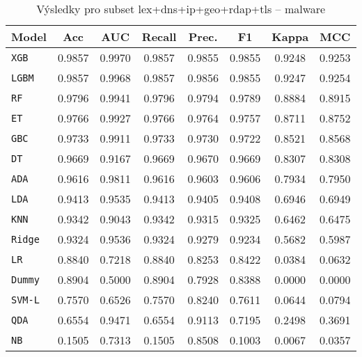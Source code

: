 \begin{table}[H]
  \centering
  \small
  \caption{Výsledky pro subset lex+dns+ip+geo+rdap+tls – malware}
  \begin{tabular}{|l|c|c|c|c|c|c|c|}
    \hline
    \textbf{Model} & \textbf{Acc} & \textbf{AUC} & \textbf{Recall} & \textbf{Prec.} & \textbf{F1} & \textbf{Kappa} & \textbf{MCC} \\
    \hline
    \texttt{XGB} & 0.9857 & 0.9970 & 0.9857 & 0.9855 & 0.9855 & 0.9248 & 0.9253 \\
    \texttt{LGBM} & 0.9857 & 0.9968 & 0.9857 & 0.9856 & 0.9855 & 0.9247 & 0.9254 \\
    \texttt{RF} & 0.9796 & 0.9941 & 0.9796 & 0.9794 & 0.9789 & 0.8884 & 0.8915 \\
    \texttt{ET} & 0.9766 & 0.9927 & 0.9766 & 0.9764 & 0.9757 & 0.8711 & 0.8752 \\
    \texttt{GBC} & 0.9733 & 0.9911 & 0.9733 & 0.9730 & 0.9722 & 0.8521 & 0.8568 \\
    \texttt{DT} & 0.9669 & 0.9167 & 0.9669 & 0.9670 & 0.9669 & 0.8307 & 0.8308 \\
    \texttt{ADA} & 0.9616 & 0.9811 & 0.9616 & 0.9603 & 0.9606 & 0.7934 & 0.7950 \\
    \texttt{LDA} & 0.9413 & 0.9535 & 0.9413 & 0.9405 & 0.9408 & 0.6946 & 0.6949 \\
    \texttt{KNN} & 0.9342 & 0.9043 & 0.9342 & 0.9315 & 0.9325 & 0.6462 & 0.6475 \\
    \texttt{Ridge} & 0.9324 & 0.9536 & 0.9324 & 0.9279 & 0.9234 & 0.5682 & 0.5987 \\
    \texttt{LR} & 0.8840 & 0.7218 & 0.8840 & 0.8253 & 0.8422 & 0.0384 & 0.0632 \\
    \texttt{Dummy} & 0.8904 & 0.5000 & 0.8904 & 0.7928 & 0.8388 & 0.0000 & 0.0000 \\
    \texttt{SVM-L} & 0.7570 & 0.6526 & 0.7570 & 0.8240 & 0.7611 & 0.0644 & 0.0794 \\
    \texttt{QDA} & 0.6554 & 0.9471 & 0.6554 & 0.9113 & 0.7195 & 0.2498 & 0.3691 \\
    \texttt{NB} & 0.1505 & 0.7313 & 0.1505 & 0.8508 & 0.1003 & 0.0067 & 0.0357 \\
    \hline
  \end{tabular}
\end{table}
\vspace{0.5cm}

